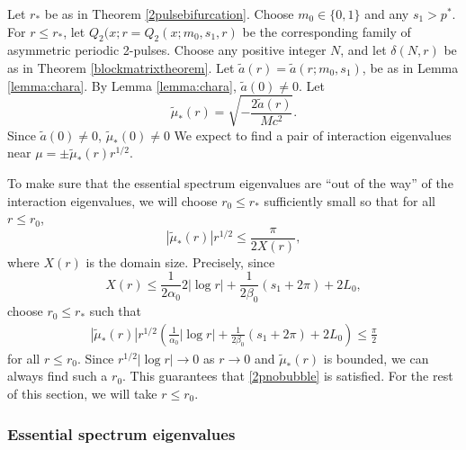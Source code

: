 \documentclass[thesis.tex]{subfiles}
\begin{document}
Let $r_*$ be as in Theorem \ref{2pulsebifurcation}. Choose $m_0 \in \{ 0, 1\}$ and any $s_1 > p^*$. For $r \leq r_*$, let $Q_2(x; r = Q_2(x; m_0, s_1, r)$ be the corresponding family of asymmetric periodic 2-pulses. Choose any positive integer $N$, and let $\delta(N,r)$ be as in Theorem \ref{blockmatrixtheorem}. Let $\tilde{a}(r) = \tilde{a}(r; m_0, s_1)$, be as in Lemma \cref{lemma:chara}. By Lemma \cref{lemma:chara}, $\tilde{a}(0) \neq 0$. Let
\begin{equation}\label{2ptildemustar}
\tilde{\mu}_*(r) = \sqrt{-\frac{2\tilde{a}(r)}{M c^2}}.
\end{equation}
Since $\tilde{a}(0) \neq 0$, $\tilde{\mu}_*(0) \neq 0$
We expect to find a pair of interaction eigenvalues near $\mu = \pm \tilde{\mu}_*(r) r^{1/2}$. 

To make sure that the essential spectrum eigenvalues are ``out of the way'' of the interaction eigenvalues, we will choose $r_0 \leq r_*$ sufficiently small so that for all $r \leq r_0$,
\begin{equation}\label{2pnobubble}
\left|\tilde{\mu}_*(r) \right| r^{1/2}  \leq \frac{\pi}{2 X(r)},
\end{equation}
where $X(r)$ is the domain size. Precisely, since
\[
X(r) \leq \frac{1}{2 \alpha_0} 2 |\log r| + \frac{1}{2\beta_0}\left( s_1 + 2 \pi \right) + 2 L_0, 
\]
choose $r_0 \leq r_*$ such that
\begin{align}\label{2pnobubblecond}
\left|\tilde{\mu}_*(r) \right| r^{1/2} \left( \frac{1}{\alpha_0} |\log r| + \frac{1}{2\beta_0}\left( s_1 + 2 \pi \right) + 2 L_0 \right) \leq \frac{\pi}{2}
\end{align}
for all $r \leq r_0$. Since $r^{1/2}|\log r| \rightarrow 0$ as $r \rightarrow 0$ and $\tilde{\mu}_*(r)$ is bounded, we can always find such a $r_0$. This guarantees that \cref{2pnobubble} is satisfied. For the rest of this section, we will take $r \leq r_0$.

\subsubsection{Essential spectrum eigenvalues}
\end{document}
